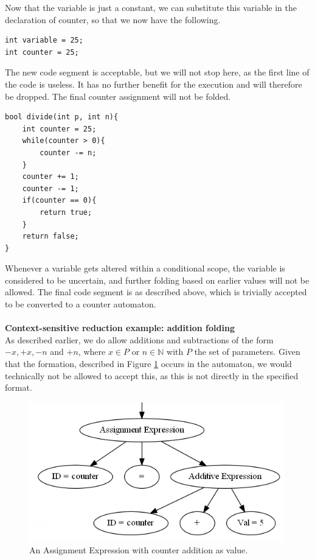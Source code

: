 \documentclass[12pt]{article}
\begin{document}
Now that the variable is just a constant, we can substitute this variable in the declaration of counter, so that we now have the following.
\begin{lstlisting}[style=CStyle]
int variable = 25;
int counter = 25;
\end{lstlisting}

The new code segment is acceptable, but we will not stop here, as the first line of the code is useless. It has no further benefit for the execution and will therefore be dropped. The final counter assignment will not be folded. 

\begin{lstlisting}[style=CStyle]
bool divide(int p, int n){
	int counter = 25;
	while(counter > 0){
		counter -= n;
	}
	counter += 1;
	counter -= 1;
	if(counter == 0){
		return true;
	}
	return false;
}
\end{lstlisting}
\noindent
Whenever a variable gets altered within a conditional scope, the variable is considered to be uncertain, and further folding based on earlier values will not be allowed. The final code segment is as described above, which is trivially accepted to be converted to a counter automaton.\\
\\
\noindent
\textbf{Context-sensitive reduction example: addition folding}\\
As described earlier, we do allow additions and subtractions of the form $-x, +x, -n$ and $+n$, where $x \in P$ or $n \in \mathbb{N}$ with $P$ the set of parameters. Given that the formation, described in Figure \ref{fig:unfolded_addition} occurs in the automaton, we would technically not be allowed to accept this, as this is not directly in the specified format.

\begin{figure}[h]
	\centering
	\includegraphics[width=0.7\linewidth]{unfolded_addition}
	\caption{An Assignment Expression with counter addition as value.}
	\label{fig:unfolded_addition}
\end{figure}
\end{document}
